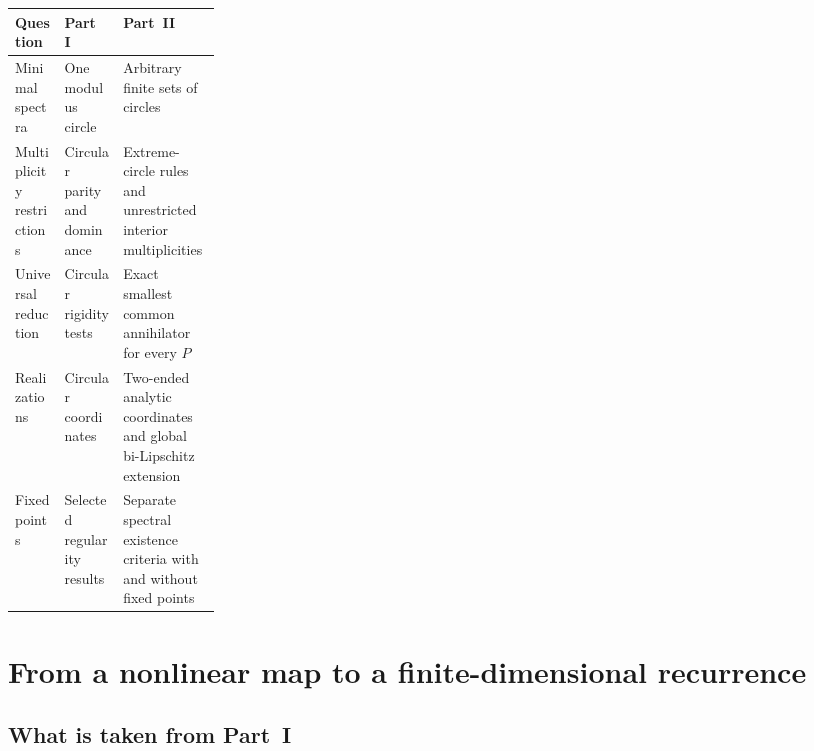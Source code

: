 \documentclass[11pt,letterpaper]{article}
\theoremstyle{definition}
\theoremstyle{remark}
\begin{document}
\begin{center}
\small
\begin{tabularx}{\linewidth}{@{}p{0.24\linewidth}XX@{}}
\toprule
Question & Part~I & Part~II\\
\midrule
Minimal spectra & One modulus circle & Arbitrary finite sets of circles\\
Multiplicity restrictions & Circular parity and dominance & Extreme-circle rules and unrestricted interior multiplicities\\
Universal reduction & Circular rigidity tests & Exact smallest common annihilator for every $P$\\
Realizations & Circular coordinates & Two-ended analytic coordinates and global bi-Lipschitz extension\\
Fixed points & Selected regularity results & Separate spectral existence criteria with and without fixed points\\
\bottomrule
\end{tabularx}
\end{center}

\section{From a nonlinear map to a finite-dimensional recurrence}
\label{nrr:sc:sec:algebra}

\subsection{What is taken from Part~I}
\label{nrr:sc:sec:imported}
\end{document}
